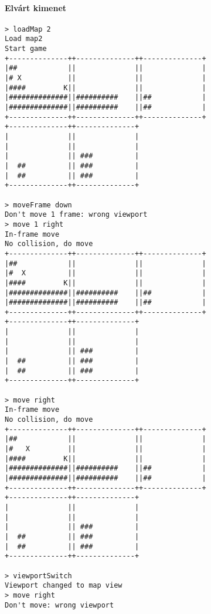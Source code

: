 		        \paragraph*{Elvárt kimenet}
\begin{verbatim}
> loadMap 2
Load map2
Start game
+--------------++--------------++--------------+
|##            ||              ||              |
|# X           ||              ||              |
|####         K||              ||              |
|##############||##########    ||##            |
|##############||##########    ||##            |
+--------------++--------------++--------------+
+--------------++--------------+                
|              ||              |                
|              ||              |                
|              || ###          |                
|  ##          || ###          |                
|  ##          || ###          |                
+--------------++--------------+                

> moveFrame down
Don't move 1 frame: wrong viewport
> move 1 right
In-frame move
No collision, do move
+--------------++--------------++--------------+
|##            ||              ||              |
|#  X          ||              ||              |
|####         K||              ||              |
|##############||##########    ||##            |
|##############||##########    ||##            |
+--------------++--------------++--------------+
+--------------++--------------+                
|              ||              |                
|              ||              |                
|              || ###          |                
|  ##          || ###          |                
|  ##          || ###          |                
+--------------++--------------+                

> move right
In-frame move
No collision, do move
+--------------++--------------++--------------+
|##            ||              ||              |
|#   X         ||              ||              |
|####         K||              ||              |
|##############||##########    ||##            |
|##############||##########    ||##            |
+--------------++--------------++--------------+
+--------------++--------------+                
|              ||              |                
|              ||              |                
|              || ###          |                
|  ##          || ###          |                
|  ##          || ###          |                
+--------------++--------------+                

> viewportSwitch
Viewport changed to map view
> move right
Don't move: wrong viewport
\end{verbatim}
	
